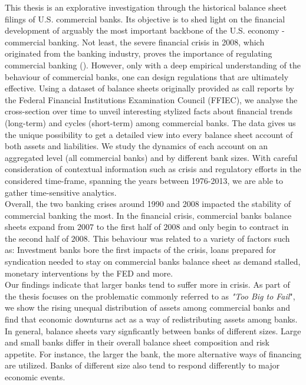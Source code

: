 \documentclass[12pt, a4paper]{article} %
\begin{document}
This thesis is an explorative investigation through the historical balance sheet filings of U.S. commercial banks. Its objective is to shed light on the financial development of arguably the most important backbone of the U.S. economy - commercial banking. Not least, the severe financial crisis in 2008, which originated from the banking industry, proves the importance of regulating commercial banking (\citet{ostrup2009origins}). However, only with a deep empirical understanding of the behaviour of commercial banks, one can design regulations that are ultimately effective. Using a dataset of balance sheets originally provided as call reports by the Federal Financial Institutions Examination Council (FFIEC), we analyse the cross-section over time to unveil interesting stylized facts about financial trends (long-term) and cycles (short-term) among commercial banks. The data gives us the unique possibility to get a detailed view into every balance sheet account of both assets and liabilities. We study the dynamics of each account on an aggregated level (all commercial banks) and by different bank sizes. With careful consideration of contextual information such as crisis and regulatory efforts in the considered time-frame, spanning the years between 1976-2013, we are able to gather time-sensitive analytics.\\
Overall, the two banking crises around 1990 and 2008 impacted the stability of commercial banking the most.
In the financial crisis, commercial banks balance sheets expand from $2007$ to the first half of $2008$ and only begin to contract in the second half of $2008$. This behaviour was related to a variety of factors such as: Investment banks bore the first impacts of the crisis, loans prepared for syndication needed to stay on commercial banks balance sheet as demand stalled, monetary interventions by the FED and more.\\
Our findings indicate that larger banks tend to suffer more in crisis.
As part of the thesis focuses on the problematic commonly referred to as \textit{"Too Big to Fail}", we show the rising unequal distribution of assets among commercial banks and find that economic downturns act as a way of redistributing assets among banks.\\
In general, balance sheets vary signficantly between banks of different sizes.
Large and small banks differ in their overall balance sheet composition and risk appetite. For instance, the larger the bank, the more alternative ways of financing are utilized. Banks of different size also tend to respond differently to major economic events.
\end{document}
